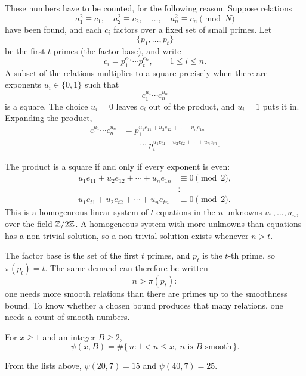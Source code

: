These numbers have to be counted, for the following reason. Suppose
relations
\[
    a_{1}^{2}\equiv c_{1},\quad
    a_{2}^{2}\equiv c_{2},\quad
    \ldots,\quad
    a_{n}^{2}\equiv c_{n}\pmod{N}
\]
have been found, and each $c_{i}$ factors over a fixed set of small
primes. Let
\[
    \{p_{1},\ldots,p_{t}\}
\]
be the first $t$ primes (the factor base), and write
\[
    c_{i}=p_{1}^{e_{1i}}\cdots p_{t}^{e_{ti}},
    \qquad 1\le i\le n.
\]
A subset of the relations multiplies to a square precisely when there
are exponents $u_{i}\in\{0,1\}$ such that
\[
    c_{1}^{u_{1}}\cdots c_{n}^{u_{n}}
\]
is a square. The choice $u_{i}=0$ leaves $c_{i}$ out of the product, and
$u_{i}=1$ puts it in. Expanding the product,
\begin{align*}
    c_{1}^{u_{1}}\cdots c_{n}^{u_{n}}
    &=
    p_{1}^{u_{1}e_{11}+u_{2}e_{12}+\cdots+u_{n}e_{1n}}\\
    &\qquad\cdots\;
    p_{t}^{u_{1}e_{t1}+u_{2}e_{t2}+\cdots+u_{n}e_{tn}}.
\end{align*}


The product is a square if and only if every exponent is even:
\begin{align*}
    u_{1}e_{11}+u_{2}e_{12}+\cdots+u_{n}e_{1n}
        &\equiv 0\pmod{2},\\
    &\vdots\\
    u_{1}e_{t1}+u_{2}e_{t2}+\cdots+u_{n}e_{tn}
        &\equiv 0\pmod{2}.
\end{align*}
This is a homogeneous linear system of $t$ equations in the $n$ unknowns
$u_{1},\ldots,u_{n}$, over the field $\mathbb Z/2\mathbb Z$. A homogeneous system with
more unknowns than equations has a non-trivial solution, so a non-trivial
solution exists whenever $n>t$.

The factor base is the set of the first $t$ primes, and $p_{t}$ is the
$t$-th prime, so $\pi(p_{t})=t$. The same demand can therefore be written
\[
    n>\pi(p_{t}):
\]
one needs more smooth relations than there are primes up to the
smoothness bound. To know whether a chosen bound produces that many
relations, one needs a count of smooth numbers.

\begin{definition}
For $x\ge 1$ and an integer $B\ge 2$,
\[
    \psi(x,B)
    =
    \#\{\,n : 1<n\le x,\ n\text{ is $B$-smooth}\,\}.
\]
\end{definition}

\begin{example}
From the lists above, $\psi(20,7)=15$ and $\psi(40,7)=25$.
\end{example}


